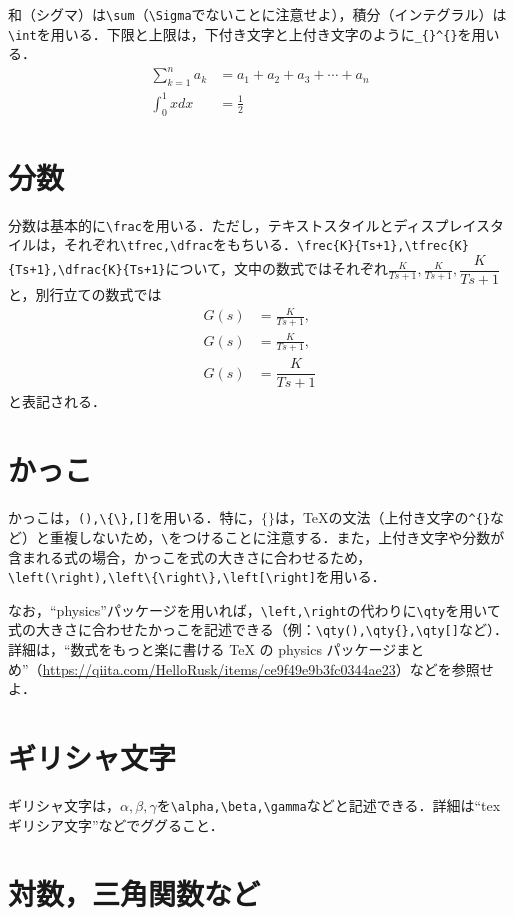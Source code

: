 \documentclass[11pt,a4paper]{jsarticle}
\begin{document}
和（シグマ）は\verb|\sum|（\verb|\Sigma|でないことに注意せよ），積分（インテグラル）は\verb|\int|を用いる．下限と上限は，下付き文字と上付き文字のように\verb|_{}^{}|を用いる．
\begin{align*}
  \sum_{k=1}^{n}a_k & =a_1+a_2+a_3+\cdots+a_n \\
  \int_0^1 x dx     & = \frac{1}{2}
\end{align*}

\section{分数}

分数は基本的に\verb|\frac|を用いる．ただし，テキストスタイルとディスプレイスタイルは，それぞれ\verb|\tfrec,\dfrac|をもちいる．\verb|\frec{K}{Ts+1},\tfrec{K}{Ts+1},\dfrac{K}{Ts+1}|について，文中の数式ではそれぞれ$\frac{K}{Ts+1},\tfrac{K}{Ts+1},\dfrac{K}{Ts+1}$と，別行立ての数式では
\begin{align*}
  G(s) & =\frac{K}{Ts+1},  \\
  G(s) & =\tfrac{K}{Ts+1}, \\
  G(s) & =\dfrac{K}{Ts+1}
\end{align*}
と表記される．

\section{かっこ}

かっこは，\verb|(),\{\},[]|を用いる．特に，$\{\}$は，\TeX の文法（上付き文字の\verb|^{}|など）と重複しないため，\verb|\|をつけることに注意する．また，上付き文字や分数が含まれる式の場合，かっこを式の大きさに合わせるため，\verb|\left(\right),\left\{\right\},\left[\right]|を用いる．

なお，``physics''パッケージを用いれば，\verb|\left,\right|の代わりに\verb|\qty|を用いて式の大きさに合わせたかっこを記述できる（例：\verb|\qty(),\qty{},\qty[]|など）．詳細は，``数式をもっと楽に書ける TeX の physics パッケージまとめ''（\url{https://qiita.com/HelloRusk/items/ce9f49e9b3fc0344ae23}）などを参照せよ．

\section{ギリシャ文字}

ギリシャ文字は，$\alpha,\beta,\gamma$を\verb|\alpha,\beta,\gamma|などと記述できる．詳細は``tex ギリシア文字''などでググること．

\section{対数，三角関数など}
\end{document}
